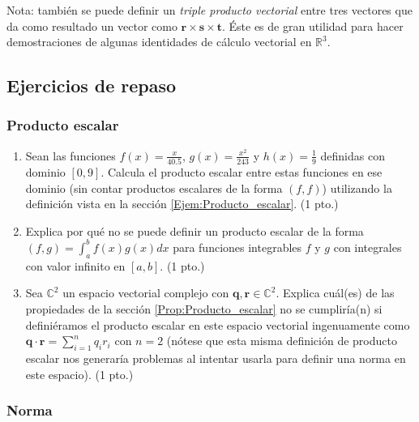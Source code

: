 \documentclass[12pt]{article}
\begin{document}
Nota: también se puede definir un \emph{triple producto vectorial} entre tres vectores que da como resultado un vector como $\mathbf{r}\times\mathbf{s}\times\mathbf{t}$. Éste es de gran utilidad para hacer demostraciones de algunas identidades de cálculo vectorial en $\mathbb{R}^3$.

\subsection{Ejercicios de repaso}

\subsubsection{Producto escalar} \label{Ejer:Producto_escalar} 

\begin{enumerate}
\item Sean las funciones $f(x)=\frac{x}{40.5}$, $g(x)=\frac{x^2}{243}$ y $h(x)=\frac{1}{9}$ definidas con dominio $[0,9]$. Calcula el producto escalar entre estas funciones en ese dominio (sin contar productos escalares de la forma $(f,f)$) utilizando la definición vista en la sección \ref{Ejem:Producto_escalar}. (1 pto.)
    \item Explica por qué no se puede definir un producto escalar de la forma $(f,g)=\int_a^b f(x)g(x)dx$ para funciones integrables $f$ y $g$ con integrales con valor infinito en $[a,b]$. (1 pto.)
    \item Sea $\mathbb{C}^2$ un espacio vectorial complejo con $\mathbf{q},\mathbf{r}\in\mathbb{C}^2$. Explica cuál(es) de las propiedades de la sección \ref{Prop:Producto_escalar} no se cumpliría(n) si definiéramos el producto escalar en este espacio vectorial ingenuamente como $\mathbf{q}\cdot\mathbf{r}=\sum_{i=1}^n q_ir_i$  con $n=2$ (nótese que esta misma definición de producto escalar nos generaría problemas al intentar usarla para definir una norma en este espacio). (1 pto.)
\end{enumerate}

\subsubsection{Norma} \label{Ejer:Norma}
\end{document}
